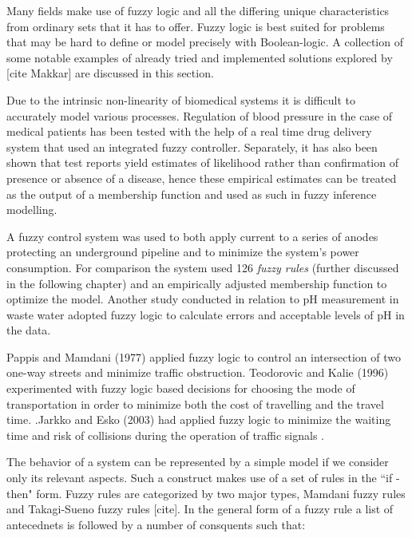 Many fields make use of fuzzy logic and all the differing unique characteristics from ordinary sets that it has to offer. Fuzzy logic is best suited for problems that may be hard to define or model precisely with Boolean-logic. A collection of some notable examples of already tried and implemented solutions explored by [cite Makkar] are discussed in this section.

Due to the intrinsic non-linearity of biomedical systems it is difficult to accurately model various processes. Regulation of blood pressure in the case of medical patients has been tested with the help of a real time drug delivery system that used an integrated fuzzy controller. Separately, it has also been shown that test reports yield estimates of likelihood rather than confirmation of presence or absence of a disease, hence these empirical estimates can be treated as the output of a membership function and used as such in fuzzy inference modelling.

A fuzzy control system was used to both apply current to a series of anodes protecting an underground pipeline and to minimize the system's power consumption. For comparison the system used 126 \textit{fuzzy rules} (further discussed in the following chapter) and an empirically adjusted membership function to optimize the model. Another study conducted in relation to pH measurement in waste water adopted fuzzy logic to calculate errors and acceptable levels of pH in the data. 

Pappis and Mamdani (1977) applied fuzzy logic to control an intersection of two one-way streets and minimize traffic obstruction. Teodorovic and Kalie (1996) experimented with fuzzy logic based decisions for choosing the mode of transportation in order to minimize both the cost of travelling and the travel time. .Jarkko and Esko (2003) had applied fuzzy logic to minimize the waiting time and risk of collisions during the operation of traffic signals .

The behavior of a system can be represented by a simple model if we consider only its relevant aspects. Such a construct makes use of a set of rules in the ``if - then" form. Fuzzy rules are categorized by two major types, Mamdani fuzzy rules and Takagi-Sueno fuzzy rules [cite]. In the general form of a fuzzy rule a list of antecednets is followed by a number of consquents such that:

